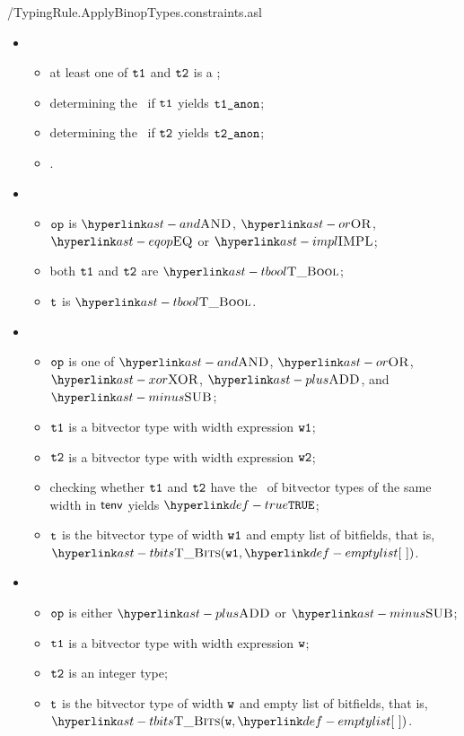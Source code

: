\pagebreak
{}
          {\typingtests/TypingRule.ApplyBinopTypes.constraints.asl}

\ProseParagraph
\OneApplies
\begin{itemize}
  \item {}
  \begin{itemize}
    \item at least one of $\texttt{t1}$ and $\texttt{t2}$ is a \namedtype;
    \item determining the \underlyingtype\ if $\texttt{t1}$ yields $\vtoneanon$\ProseOrTypeError;
    \item determining the \underlyingtype\ if $\texttt{t2}$ yields $\vttwoanon$\ProseOrTypeError;
    \item \Proseapplybinoptypes{$\tenv$}{$\op$}{$\vtoneanon$}{$\vttwoanon$}{$\vt$\ProseOrTypeError}.
  \end{itemize}

  \item {}
  \begin{itemize}
    \item $\op$ is $\AND$, $\OR$, $\EQOP$ or $\IMPL$;
    \item both $\texttt{t1}$ and $\texttt{t2}$ are $\TBool$;
    \item $\vt$ is $\TBool$.
  \end{itemize}

  \item {}
  \begin{itemize}
    \item $\op$ is one of $\AND$, $\OR$, $\XOR$, $\PLUS$, and $\MINUS$;
    \item $\texttt{t1}$ is a bitvector type with width expression $\texttt{w1}$;
    \item $\texttt{t2}$ is a bitvector type with width expression $\texttt{w2}$;
    \item checking whether $\texttt{t1}$ and $\texttt{t2}$ have the \structure\ of bitvector types
          of the same width in $\tenv$ yields $\True$\ProseOrTypeError;
    \item $\vt$ is the bitvector type of width $\texttt{w1}$ and empty list of bitfields, that is, \\ $\TBits(\vwone, \emptylist)$.
  \end{itemize}

  \item {}
  \begin{itemize}
    \item $\op$ is either $\PLUS$ or $\MINUS$;
    \item $\texttt{t1}$ is a bitvector type with width expression $\texttt{w}$;
    \item $\texttt{t2}$ is an integer type;
    \item $\vt$ is the bitvector type of width $\texttt{w}$ and empty list of bitfields, that is, \\ $\TBits(\vw, \emptylist)$.
  \end{itemize}


\end{itemize}
